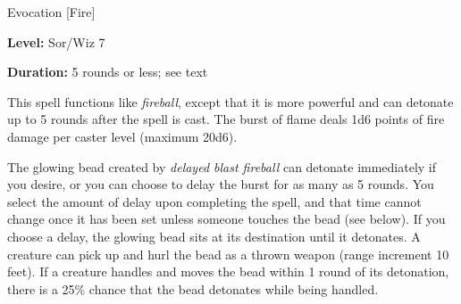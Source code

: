
Evocation [Fire]

\textbf{Level:} Sor/Wiz 7

\textbf{Duration:} 5 rounds or less; see text

This spell functions like \textit{fireball}, except that it is more powerful and 
can detonate up to 5 rounds after the spell is cast. The burst of flame deals 1d6 
points of fire damage per caster level (maximum 20d6).

The glowing bead created by \textit{delayed blast fireball} can detonate immediately 
if you desire, or you can choose to delay the burst for as many as 5 rounds. You 
select the amount of delay upon completing the spell, and that time cannot change 
once it has been set unless someone touches the bead (see below). If you choose 
a delay, the glowing bead sits at its destination until it detonates. A creature 
can pick up and hurl the bead as a thrown weapon (range increment 10 feet). If 
a creature handles and moves the bead within 1 round of its detonation, there is 
a 25\% chance that the bead detonates while being handled.

